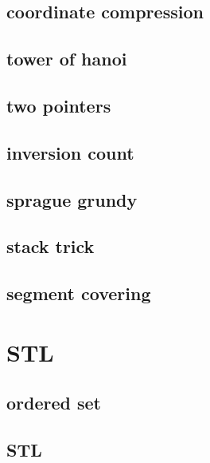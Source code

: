 \subsection{coordinate compression}
\raggedbottom
\hrulefill
\subsection{tower of hanoi}
\raggedbottom
\hrulefill
\subsection{two pointers}
\raggedbottom
\hrulefill
\subsection{inversion count}
\raggedbottom
\hrulefill
\subsection{sprague grundy}
\raggedbottom
\hrulefill
\subsection{stack trick}
\raggedbottom
\hrulefill
\subsection{segment covering}
\raggedbottom
\hrulefill

\section{STL}
\subsection{ordered set}
\raggedbottom
\hrulefill
\subsection{STL}
\raggedbottom
\hrulefill

